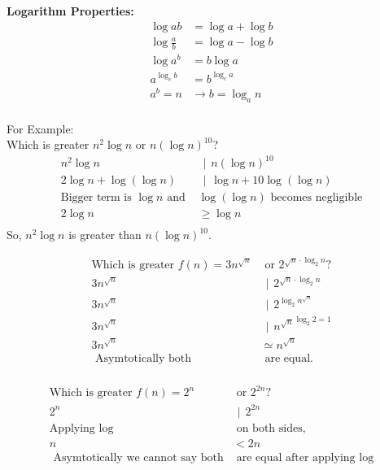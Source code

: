 \documentclass{article}
\newcommand{\bioperation}{{\hspace{5pt} | \hspace{5pt}}}
\begin{document}
\textbf{Logarithm Properties: } \\
\[ 
\begin{aligned}
    \log{ab} &= \log{a} + \log{b} \\
    \log{\frac{a}{b}} &= \log{a} - \log{b} \\
    \log{a^b} &= b\log{a} \\
    a^{\log_c{b}} &= b^{\log_c{a}} \\
    a^b = n &\rightarrow b = \log_a{n} \\
\end{aligned}
\]

For Example: \\
Which is greater $n^2\log{n} \text{ or } n{(\log{n})}^{10}$? \\
\[
\begin{aligned}
    n^2\log{n} &\bioperation n{(\log{n})}^{10} \\
    2\log{n} + \log(\log{n}) &\bioperation \log{n} + 10{\log(\log{n})} \\
    \text{Bigger term is $\log{n}$ and } &\log({\log{n}}) \text{ becomes negligible}\\
    2\log{n} &\geq \log{n} \\
\end{aligned}
\]
So, $n^2\log{n}$ is greater than $n{(\log{n})}^{10}$.

\[
\begin{aligned}
    \text{Which is greater } f(n) = 3n^{\sqrt{n}} &\text{ or } 2^{\sqrt{n}\cdot \log_2{n}}? \\
    3n^{\sqrt{n}} &\bioperation 2^{\sqrt{n}\cdot \log_2{n}} \\
    3n^{\sqrt{n}} &\bioperation 2^{\log_2{n^{\sqrt{n}}}} \\
    3n^{\sqrt{n}} &\bioperation {n^{\sqrt{n}}}^{\log_2{2} = 1} \\
    3n^{\sqrt{n}} &\simeq  n^{\sqrt{n}} \\
    \text{ Asymtotically both} &\text{ are equal.} \\
\end{aligned}
\]

\[
\begin{aligned}
    \text{Which is greater } f(n) = 2^n &\text{ or } 2^{2n}? \\
    2^n &\bioperation 2^{2n} \\
    \text{Applying }\log &\text{ on both sides, }\\
    n &< 2n \\
    \text{ Asymtotically we cannot say both} &\text{ are equal after applying } \log \\
\end{aligned}
\]
\end{document}
